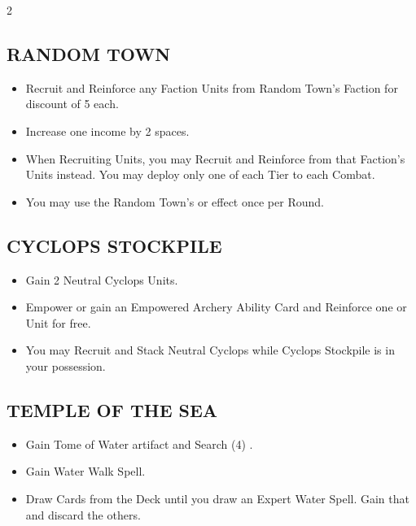 \begin{multicols*}{2}
\subsection*{\MakeUppercase{Random Town}}
\begin{itemize}
  \item Recruit and Reinforce any Faction Units from Random Town's Faction for discount of 5  each.
  \item Increase one income by 2 spaces.
  \item When Recruiting Units, you may Recruit and Reinforce from that Faction's Units instead. You may deploy only one of each Tier to each Combat.
  \item You may use the Random Town's  or  effect once per Round.
\end{itemize}

\subsection*{\MakeUppercase{Cyclops Stockpile}}
\begin{itemize}
  \item Gain 2 Neutral Cyclops Units.
  \item Empower or gain an Empowered Archery Ability Card and Reinforce one  or   Unit for free.
  \item You may Recruit and Stack Neutral Cyclops while Cyclops Stockpile is in your possession.
\end{itemize}

\subsection*{\MakeUppercase{Temple of the Sea}}
\begin{itemize}
  \item Gain Tome of Water artifact and Search (4) .
  \item Gain Water Walk Spell.
  \item Draw Cards from the  Deck until you draw an Expert Water Spell. Gain that and discard the others.
\end{itemize}


\end{multicols*}

